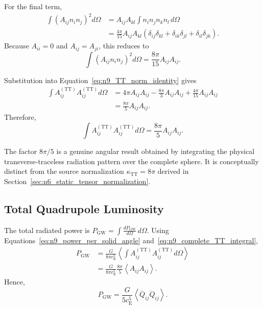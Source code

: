 For the final term,
\begin{equation}
    \begin{aligned}
        \int \left( A_{ij}n_{i}n_{j} \right)^{2} d\Omega &= A_{ij}A_{kl} \int n_{i}n_{j}n_{k}n_{l} \,d\Omega \\
        &= \frac{4\pi}{15} A_{ij}A_{kl} \left( \delta_{ij}\delta_{kl} + \delta_{ik}\delta_{jl} + \delta_{il}\delta_{jk} \right).
    \end{aligned}
\end{equation}
Because $A_{ii} = 0$ and $A_{ij} = A_{ji}$, this reduces to
\begin{equation}
    \int \left( A_{ij}n_{i}n_{j} \right)^{2} d\Omega = \frac{8\pi}{15} A_{ij}A_{ij}.
    \label{eq:n9_fourth_moment_contraction}
\end{equation}

Substitution into Equation~\eqref{eq:n9_TT_norm_identity} gives
\begin{equation}
    \begin{aligned}
        \int A_{ij}^{(\mathrm{TT})} A_{ij}^{(\mathrm{TT})} d\Omega &= 4\pi A_{ij}A_{ij} - \frac{8\pi}{3} A_{ij}A_{ij} + \frac{4\pi}{15} A_{ij}A_{ij} \\
        &= \frac{8\pi}{5} A_{ij}A_{ij}.
    \end{aligned}
\end{equation}
Therefore,
\begin{equation}
    \int A_{ij}^{(\mathrm{TT})} A_{ij}^{(\mathrm{TT})} d\Omega = \frac{8\pi}{5} A_{ij}A_{ij}.
    \label{eq:n9_complete_TT_integral}
\end{equation}

The factor $8\pi/5$ is a genuine angular result obtained by integrating the physical transverse-traceless radiation pattern over the complete sphere. It is conceptually distinct from the source normalization $\kappa_{\mathrm{TT}} = 8\pi$ derived in Section~\ref{sec:n6_static_tensor_normalization}.

\subsection{Total Quadrupole Luminosity}
\label{subsec:n9_total_quadrupole_luminosity}

The total radiated power is $P_{\mathrm{GW}} = \int \frac{dP_{\mathrm{GW}}}{d\Omega} \,d\Omega$. Using Equations~\eqref{eq:n9_power_per_solid_angle} and~\eqref{eq:n9_complete_TT_integral},
\begin{equation}
    \begin{aligned}
        P_{\mathrm{GW}} &= \frac{ G }{ 8\pi c_{\mathrm{E}}^{5} } \left\langle \int A_{ij}^{(\mathrm{TT})} A_{ij}^{(\mathrm{TT})} d\Omega \right\rangle \\
        &= \frac{ G }{ 8\pi c_{\mathrm{E}}^{5} } \frac{8\pi}{5} \left\langle A_{ij}A_{ij} \right\rangle.
    \end{aligned}
\end{equation}
Hence,
\begin{equation}
    P_{\mathrm{GW}} = \frac{ G }{ 5c_{\mathrm{E}}^{5} } \left\langle \dddot{Q}_{ij} \dddot{Q}_{ij} \right\rangle.
    \label{eq:n9_quadrupole_luminosity}
\end{equation}

